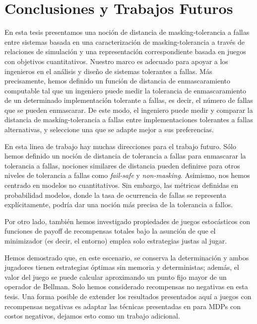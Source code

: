\chapter{Conclusiones y Trabajos Futuros}
\label{cap:conclusiones}

En esta tesis presentamos una noción de distancia de masking-tolerancia a fallas
entre sistemas basada en una caracterización de masking-tolerancia a través de relaciones de simulación y una representación correspondiente basada en juegos con objetivos cuantitativos.
Nuestro marco es adecuado para apoyar a los ingenieros en el análisis y
diseño de sistemas tolerantes a fallas. Más precisamente, hemos definido un
función de distancia de enmascaramiento computable tal que un ingeniero
puede medir la tolerancia de enmascaramiento de un determinado
implementación tolerante a fallas, es decir, el número de fallas que se pueden enmascarar.
De este modo, el ingeniero puede medir y comparar la distancia de masking-tolerancia a fallas 
entre implementaciones tolerantes a fallas alternativas, y seleccione una que
se adapte mejor a sus preferencias.

En esta linea de trabajo hay muchas direcciones para el trabajo futuro. Sólo hemos definido un
noción de distancia de tolerancia a fallas para enmascarar la tolerancia a fallas,
nociones similares de distancia pueden definirse para otros niveles de
tolerancia a fallas como \emph{fail-safe} y \emph{non-masking}. Asimismo, nos hemos centrado
en modelos no cuantitativos. Sin embargo, las métricas definidas en probabilidad
modelos, donde la tasa de ocurrencia de fallas se representa explícitamente,
podría dar una noción más precisa de la tolerancia a fallos.

Por otro lado, también hemos investigado propiedades de juegos estocásticos con funciones de payoff de recompensas totales bajo la asunción de que el minimizador (es decir, el entorno) emplea solo estrategias justas al jugar.  %

Hemos demostrado que, en este escenario, se conserva la determinación y ambos jugadores tienen estrategias óptimas sin memoria y deterministas; además, el valor del juego se puede calcular aproximando un punto fijo mayor de un operador de Bellman. Solo hemos considerado recompensas no negativas en esta tesis. Una forma posible de extender los resultados presentados aquí a juegos con recompensas negativas es adaptar las técnicas presentadas en \cite{DBLP:conf/lics/Baier0DGS18} para MDPs con costos negativos, dejamos esto como un trabajo adicional.

